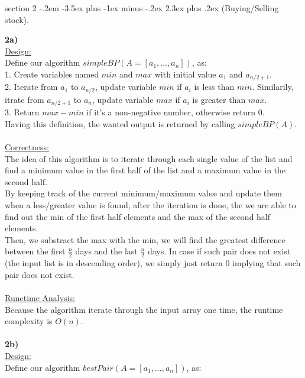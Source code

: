 \documentclass{article}
\makeatletter
\newenvironment{problem}{\@startsection
       {section}
       {2}
       {-.2em}
       {-3.5ex plus -1ex minus -.2ex}
       {2.3ex plus .2ex}
       {\pagebreak[3]%
       \large\bf\noindent{Problem }
       }
       }
\makeatother
\begin{document}
\newpage

\begin{problem}{(Buying/Selling stock).}

\textbf{2a)}\\
\underline{Design:}\\
Define our algorithm \(simpleBP(A = [a_1,...,a_n])\), as:\\
1. Create variables named \(min\) and \(max\) with initial value \(a_1\) and \(a_{n/2+1}\).\\
2. Iterate from \(a_1\) to \(a_{n/2}\), update variable \(min\) if \(a_i\) is less than \(min\). Similarily, itrate from \(a_{n/2+1}\) to \(a_n\), update variable \(max\) if \(a_i\) is greater than \(max\).\\
3. Return \(max - min\) if it's a non-negative number, otherwise return 0.\\
Having this definition, the wanted output is returned by calling \(simpleBP(A)\).
\\ \hspace*{\fill} \\
\underline{Correctness:}\\
The idea of this algorithm is to iterate through each single value of the list and find a minimum value in the first half of the list and a maximum value in the second half.\\
By keeping track of the current minimum/maximum value and update them when a less/greater value is found, after the iteration is done, the we are able to find out the min of the first half elements and the max of the second half elements.\\
Then, we substract the max with the min, we will find the greatest difference between the first \(\frac{n}{2}\) days and the last \(\frac{n}{2}\) days. In case if such pair does not exist (the input list is in descending order), we simply just return 0 implying that such pair does not exist.
\\ \hspace*{\fill} \\
\underline{Runetime Analysis:}\\
Because the algorithm iterate through the input array one time, the runtime complexity is \(O(n)\).
\\ \hspace*{\fill} \\
\textbf{2b)}\\
\underline{Design:}\\
Define our algorithm \(bestPair(A = [a_1,...,a_n])\), as:\\

\end{problem}
\end{document}
